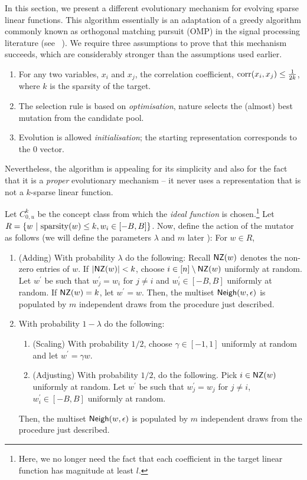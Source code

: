 In this section, we present a different evolutionary mechanism for evolving
sparse linear functions. This algorithm essentially is an adaptation of a
greedy algorithm commonly known as orthogonal matching pursuit (OMP) in the
signal processing literature (see ~\cite{Donoho:2006-recovery,
Tropp:2004-greed}). We require three assumptions to prove that this mechanism
succeeds, which are considerably stronger than the assumptions used earlier.
\begin{enumerate}
%
\item For any two variables, $x_i$ and $x_j$, the correlation coefficient,
$\mathrm{corr}(x_i, x_j) \leq \frac{1}{2k}$, where $k$ is the sparsity of the target.
%
\item The selection rule is based on \emph{optimisation}, \ie nature selects the
(almost) best mutation from the candidate pool. 
%
\item Evolution is allowed \emph{initialisation}; the starting representation
corresponds to the $0$ vector.
%
\end{enumerate}

Nevertheless, the algorithm is appealing for its simplicity and also for the fact
that it is a \emph{proper} evolutionary mechanism -- it never uses a
representation that is not a $k$-sparse linear function. 

Let $C^k_{0, u}$ be the concept class from which the \emph{ideal function} is
chosen.\footnote{Here, we no longer need the fact that each coefficient in the
target linear function has magnitude at least $l$.} Let $R = \{w ~|~
\mathrm{sparsity}(w) \leq k, w_i \in [-B, B] \}$. Now, define the action of the mutator
as follows (we will define the parameters $\lambda$ and $m$ later ): For $w \in R$, 
\begin{enumerate}
\item (Adding) With probability $\lambda$ do the following:
Recall $\mathsf{NZ}(w)$ denotes the non-zero entries of $w$. If $|\mathsf{NZ}(w)| < k$, choose
$i \in [n] \setminus \mathsf{NZ}(w)$ uniformly at random. Let $w^\prime$ be such that
$w^\prime_j = w_i$ for $j \neq i$ and $w^\prime_i \in [-B, B]$ uniformly at
random. If $\mathsf{NZ}(w)= k$, let $w^\prime = w$. Then, the multiset $\mathsf{Neigh}(w,
\epsilon)$ is populated by $m$ independent draws from the procedure just
described.
%
\item With probability $1 - \lambda$ do the following:
%
\begin{enumerate}
\item (Scaling) With probability $1/2$, choose $\gamma \in [-1, 1]$ uniformly at
random and let $w^\prime = \gamma w$.
%
\item (Adjusting) With probability $1/2$, do the following.  Pick $i \in \mathsf{NZ}(w)$
uniformly at random.  Let $w^\prime$ be such that $w^\prime_j = w_j$ for $j \neq
i$, $w^\prime_i \in [-B, B]$ uniformly at random.
\end{enumerate}
Then, the multiset $\mathsf{Neigh}(w, \epsilon)$ is populated by $m$ independent draws
from the procedure just described.
\end{enumerate}

